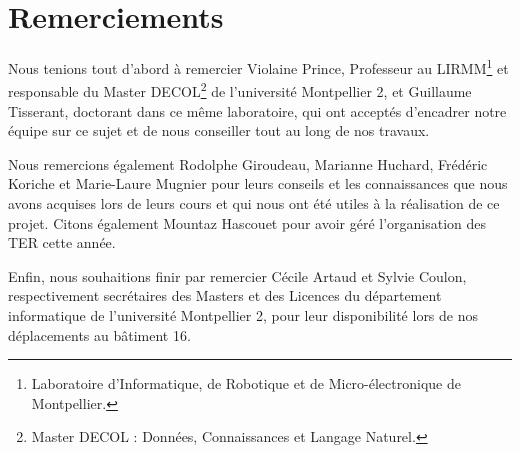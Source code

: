 \chapter*{Remerciements}

Nous tenions tout d'abord à remercier \mbox{Violaine} \mbox{Prince}, Professeur au LIRMM\footnote{Laboratoire d'Informatique, de Robotique et de Micro-électronique de Montpellier.} et responsable du Master DECOL\footnote{Master DECOL : Données, Connaissances et Langage Naturel.} de l'université Montpellier 2, et \mbox{Guillaume} \mbox{Tisserant}, doctorant dans ce même laboratoire, qui ont acceptés d'encadrer notre équipe sur ce sujet et de nous conseiller tout au long de nos travaux.

Nous remercions également \mbox{Rodolphe} \mbox{Giroudeau}, \mbox{Marianne} \mbox{Huchard}, \mbox{Frédéric} \mbox{Koriche} et \mbox{Marie-Laure} \mbox{Mugnier} pour leurs conseils et les connaissances que nous avons acquises lors de leurs cours et qui nous ont été utiles à la réalisation de ce projet. Citons également \mbox{Mountaz} \mbox{Hascouet} pour avoir géré l'organisation des TER cette année.

Enfin, nous souhaitions finir par remercier \mbox{Cécile} \mbox{Artaud} et \mbox{Sylvie} \mbox{Coulon}, respectivement secrétaires des Masters et des Licences du département informatique de l'université Montpellier 2, pour leur disponibilité lors de nos déplacements au bâtiment 16.

